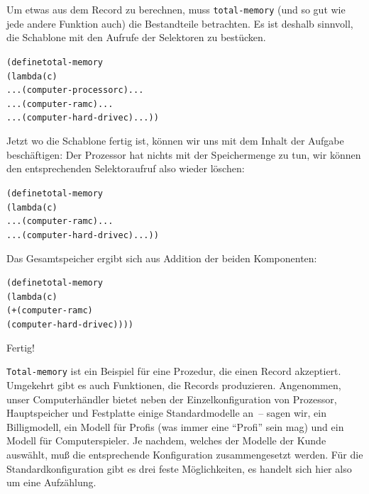 %
Um etwas aus dem Record zu berechnen, muss \texttt{total-memory} (und
so gut wie jede andere Funktion auch) die Bestandteile betrachten.  Es
ist deshalb sinnvoll, die Schablone mit den Aufrufe der Selektoren zu
bestücken.
%
\begin{alltt}
(define total-memory
  (lambda (c)
    ... (computer-processor c) ...
    ... (computer-ram c) ...
    ... (computer-hard-drive c) ...))
\end{alltt}
%
Jetzt wo die Schablone fertig ist, können wir uns mit dem Inhalt der
Aufgabe beschäftigen: Der Prozessor hat nichts mit der
Speichermenge zu tun, wir können den entsprechenden Selektoraufruf
also wieder löschen:
%
\begin{alltt}
(define total-memory
  (lambda (c)
    ... (computer-ram c) ...
    ... (computer-hard-drive c) ...))
\end{alltt}
%
Das Gesamtspeicher ergibt sich aus Addition der beiden Komponenten:
%
\begin{alltt}
(define total-memory
  (lambda (c)
    (+ (computer-ram c)
       (computer-hard-drive c))))
\end{alltt}
%
Fertig!

\texttt{Total-memory} ist ein Beispiel für eine Prozedur, die einen
Record akzeptiert.  Umgekehrt gibt es auch Funktionen, die Records
produzieren.  Angenommen, unser Computerhändler bietet neben der
Einzelkonfiguration von Prozessor, Hauptspeicher und Festplatte einige
Standardmodelle an~-- sagen wir, ein Billigmodell, ein Modell für
Profis (was immer eine "`Profi"' sein mag) und ein Modell für
Computerspieler.  Je nachdem, welches der Modelle der Kunde auswählt,
muß die entsprechende Konfiguration zusammengesetzt werden.  Für die
Standardkonfiguration gibt es drei feste Möglichkeiten, es handelt
sich hier also um eine Aufzählung.

